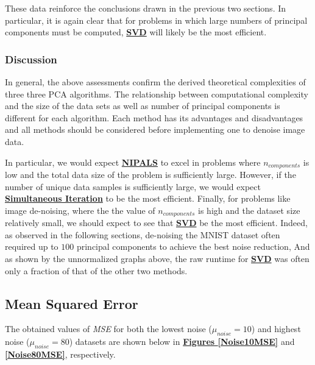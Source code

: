 \documentclass[12pt]{article}
\begin{document}
These data reinforce the conclusions drawn in the previous two sections. In particular, it is again clear that for problems in which large numbers of principal components must be computed, \textbf{\hyperref[3.2]{SVD}} will likely be the most efficient.

\subsubsection{Discussion}\label{5.1.5}

In general, the above assessments confirm the derived theoretical complexities of three three PCA algorithms. The relationship between computational complexity and the size of the data sets as well as number of principal components is different for each algorithm. Each method has its advantages and disadvantages and all methods should be considered before implementing one to denoise image data.

In particular, we would expect \textbf{\hyperref[3.1]{NIPALS}} to excel in problems where $n_{components}$ is low and the total data size of the problem is sufficiently large. However, if the number of unique data samples is sufficiently large, we would expect \textbf{\hyperref[3.3]{Simultaneous Iteration}} to be the most efficient. Finally, for problems like image de-noising, where the the value of $n_{components}$ is high and the dataset size relatively small, we should expect to see that \textbf{\hyperref[3.2]{SVD}} be the most efficient.
Indeed, as observed in the following sections, de-noising the MNIST dataset often required up to $100$ principal components to achieve the best noise reduction, And as shown by the unnormalized graphs above, the raw runtime for \textbf{\hyperref[3.2]{SVD}} was often only a fraction of that of the other two methods.

\subsection{Mean Squared Error}\label{5.2}

The obtained values of \textit{MSE} for both the lowest noise ($\mu_{noise}=10$) and highest noise ($\mu_{noise}=80$) datasets are shown below in \textbf{\hyperref[Noise10MSE]{Figures \ref*{Noise10MSE}}} and \textbf{\hyperref[Noise80MSE]{\ref*{Noise80MSE}}}, respectively.
\end{document}
